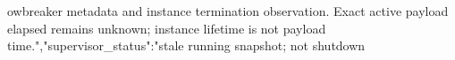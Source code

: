 \documentclass[10pt]{article}
\begin{document}
owbreak{}e\allowbreak{}r\allowbreak{} \allowbreak{}m\allowbreak{}e\allowbreak{}t\allowbreak{}a\allowbreak{}d\allowbreak{}a\allowbreak{}t\allowbreak{}a\allowbreak{} \allowbreak{}a\allowbreak{}n\allowbreak{}d\allowbreak{} \allowbreak{}i\allowbreak{}n\allowbreak{}s\allowbreak{}t\allowbreak{}a\allowbreak{}n\allowbreak{}c\allowbreak{}e\allowbreak{} \allowbreak{}t\allowbreak{}e\allowbreak{}r\allowbreak{}m\allowbreak{}i\allowbreak{}n\allowbreak{}a\allowbreak{}t\allowbreak{}i\allowbreak{}o\allowbreak{}n\allowbreak{} \allowbreak{}o\allowbreak{}b\allowbreak{}s\allowbreak{}e\allowbreak{}r\allowbreak{}v\allowbreak{}a\allowbreak{}t\allowbreak{}i\allowbreak{}o\allowbreak{}n\allowbreak{}.\allowbreak{} \allowbreak{}E\allowbreak{}x\allowbreak{}a\allowbreak{}c\allowbreak{}t\allowbreak{} \allowbreak{}a\allowbreak{}c\allowbreak{}t\allowbreak{}i\allowbreak{}v\allowbreak{}e\allowbreak{} \allowbreak{}p\allowbreak{}a\allowbreak{}y\allowbreak{}l\allowbreak{}o\allowbreak{}a\allowbreak{}d\allowbreak{} \allowbreak{}e\allowbreak{}l\allowbreak{}a\allowbreak{}p\allowbreak{}s\allowbreak{}e\allowbreak{}d\allowbreak{} \allowbreak{}r\allowbreak{}e\allowbreak{}m\allowbreak{}a\allowbreak{}i\allowbreak{}n\allowbreak{}s\allowbreak{} \allowbreak{}u\allowbreak{}n\allowbreak{}k\allowbreak{}n\allowbreak{}o\allowbreak{}w\allowbreak{}n\allowbreak{};\allowbreak{} \allowbreak{}i\allowbreak{}n\allowbreak{}s\allowbreak{}t\allowbreak{}a\allowbreak{}n\allowbreak{}c\allowbreak{}e\allowbreak{} \allowbreak{}l\allowbreak{}i\allowbreak{}f\allowbreak{}e\allowbreak{}t\allowbreak{}i\allowbreak{}m\allowbreak{}e\allowbreak{} \allowbreak{}i\allowbreak{}s\allowbreak{} \allowbreak{}n\allowbreak{}o\allowbreak{}t\allowbreak{} \allowbreak{}p\allowbreak{}a\allowbreak{}y\allowbreak{}l\allowbreak{}o\allowbreak{}a\allowbreak{}d\allowbreak{} \allowbreak{}t\allowbreak{}i\allowbreak{}m\allowbreak{}e\allowbreak{}.\allowbreak{}"\allowbreak{},\allowbreak{}"\allowbreak{}s\allowbreak{}u\allowbreak{}p\allowbreak{}e\allowbreak{}r\allowbreak{}v\allowbreak{}i\allowbreak{}s\allowbreak{}o\allowbreak{}r\allowbreak{}\_\allowbreak{}s\allowbreak{}t\allowbreak{}a\allowbreak{}t\allowbreak{}u\allowbreak{}s\allowbreak{}"\allowbreak{}:\allowbreak{}"\allowbreak{}s\allowbreak{}t\allowbreak{}a\allowbreak{}l\allowbreak{}e\allowbreak{} \allowbreak{}r\allowbreak{}u\allowbreak{}n\allowbreak{}n\allowbreak{}i\allowbreak{}n\allowbreak{}g\allowbreak{} \allowbreak{}s\allowbreak{}n\allowbreak{}a\allowbreak{}p\allowbreak{}s\allowbreak{}h\allowbreak{}o\allowbreak{}t\allowbreak{};\allowbreak{} \allowbreak{}n\allowbreak{}o\allowbreak{}t\allowbreak{} \allowbreak{}s\allowbreak{}h\allowbreak{}u\allowbreak{}t\allowbreak{}d\allowbreak{}o\allowbreak{}w\allowbreak{}n\allowbreak{} 
\end{document}
